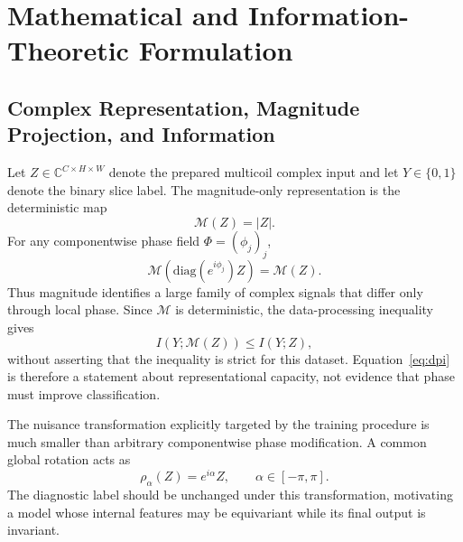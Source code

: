 \section{Mathematical and Information-Theoretic Formulation}\label{sec:math}
\subsection{Complex Representation, Magnitude Projection, and Information}
Let $Z\in\mathbb{C}^{C\times H\times W}$ denote the prepared multicoil complex input and let $Y\in\{0,1\}$ denote the binary slice label. The magnitude-only representation is the deterministic map
\begin{equation}
\mathcal{M}(Z)=|Z|.
\label{eq:magnitude-map}
\end{equation}
For any componentwise phase field $\Phi=(\phi_j)_j$,
\begin{equation}
\mathcal{M}\!\left(\mathrm{diag}(e^{i\phi_j})Z\right)=\mathcal{M}(Z).
\end{equation}
Thus magnitude identifies a large family of complex signals that differ only through local phase. Since $\mathcal{M}$ is deterministic, the data-processing inequality gives
\begin{equation}
I(Y;\mathcal{M}(Z))\le I(Y;Z),
\label{eq:dpi}
\end{equation}
without asserting that the inequality is strict for this dataset. Equation~\eqref{eq:dpi} is therefore a statement about representational capacity, not evidence that phase must improve classification.

The nuisance transformation explicitly targeted by the training procedure is much smaller than arbitrary componentwise phase modification. A common global rotation acts as
\begin{equation}
\rho_\alpha(Z)=e^{i\alpha}Z,\qquad \alpha\in[-\pi,\pi].
\label{eq:u1-action}
\end{equation}
The diagnostic label should be unchanged under this transformation, motivating a model whose internal features may be equivariant while its final output is invariant.

